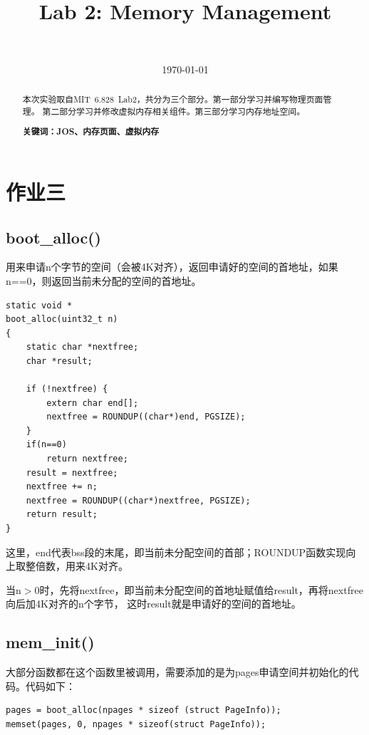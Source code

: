\documentclass[12pt,a4paper,UTF8]{article}
\begin{document}
\title{Lab 2: Memory Management}
\author{\ }
\date{\today}

\maketitle

\begin{abstract}
    \setlength{\parindent}{2em}
    本次实验取自MIT\ 6.828\ Lab2，共分为三个部分。第一部分学习并编写物理页面管理。
    第二部分学习并修改虚拟内存相关组件。第三部分学习内存地址空间。

    \textbf{关键词：JOS、内存页面、虚拟内存}
\end{abstract}

\section{作业三}

    \subsection{boot\_alloc()}
    用来申请n个字节的空间（会被4K对齐），返回申请好的空间的首地址，如果n==0，则返回当前未分配的空间的首地址。

    \begin{lstlisting}[style=CPP]
static void *
boot_alloc(uint32_t n)
{
	static char *nextfree;
	char *result;

	if (!nextfree) {
		extern char end[];
		nextfree = ROUNDUP((char*)end, PGSIZE);
	}
	if(n==0)
		return nextfree;
	result = nextfree;
	nextfree += n;
	nextfree = ROUNDUP((char*)nextfree, PGSIZE);
	return result;
}
    \end{lstlisting}

    这里，end代表bss段的末尾，即当前未分配空间的首部；ROUNDUP函数实现向上取整倍数，用来4K对齐。
    
    当n$>$0时，先将nextfree，即当前未分配空间的首地址赋值给result，再将nextfree向后加4K对齐的n个字节，
    这时result就是申请好的空间的首地址。

    \subsection{mem\_init()}

    大部分函数都在这个函数里被调用，需要添加的是为pages申请空间并初始化的代码。代码如下：

    \begin{lstlisting}[style=CPP]
pages = boot_alloc(npages * sizeof (struct PageInfo));
memset(pages, 0, npages * sizeof(struct PageInfo));
    \end{lstlisting}
\end{document}
